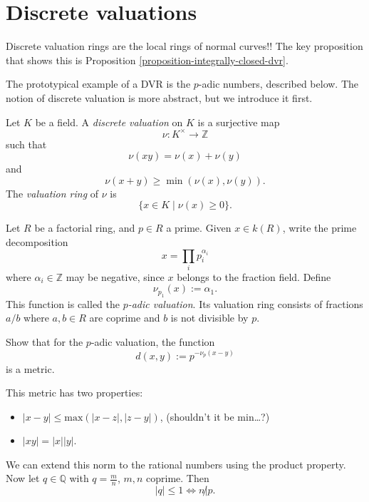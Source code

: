 \section{Discrete valuations}
\label{section-discrete-valuations}

\noindent
Discrete valuation rings are
the local rings of normal curves!!
The key proposition that
shows this is
Proposition 
\ref{proposition-integrally-closed-dvr}.

\medskip\noindent
The prototypical example of a DVR
is the $p$-adic numbers, described below.
The notion of discrete valuation is more
abstract, but we introduce it first.

\begin{definition}
\label{definition-discrete-valuation}
Let $K$ be a field. A {\it discrete valuation}
on
$K$ is a surjective map
$$
\nu:K^\times\to \mathbb{Z}
$$
such that
$$
\nu(xy)=\nu(x)+\nu(y)
$$
and
$$
\nu(x+y)\geq \min(\nu(x),\nu(y)).
$$
The {\it valuation ring} of $\nu$ is
$$
\{x\in K\mid \nu(x)\geq 0\}.
$$
\end{definition}

\begin{example}
\label{example-p-adic-valuation}
Let $R$ be a factorial ring, and
$p\in R$ a prime. Given $x\in k(R)$, write
the prime decomposition
$$
x=\prod_i p_i^{\alpha_i}
$$
where $\alpha_i\in \mathbb{Z}$ may be
negative, since $x$ belongs to the fraction
field. Define
$$
\nu_{p_1}(x):=\alpha_1.
$$
This function is called the {\it $p$-adic
valuation}. Its valuation ring consists of
fractions $a/b$ where $a,b\in R$ are
coprime and $b$ is not divisible by $p$.
\end{example}

\begin{exercise}
\label{exercise-p-adic-metric}
Show that for the $p$-adic valuation, the
function
$$
d(x,y):=p^{-\nu_p(x-y)}
$$
is a metric.
\end{exercise}

\noindent
This metric has two properties:
\begin{itemize}
\item $|x-y|\leq \text{max}(
|x-z|,|z-y|)$, (shouldn't it be min…?)
\item $|xy|=|x||y|$.
\end{itemize}

\noindent
We can extend this norm to the rational
numbers using the product property.
Now let $q \in \mathbb{Q}$
with $q=\frac{m}{n}$, $m,n$ coprime.
Then
$$
|q|\leq  1 
\iff n \not| p.
$$

